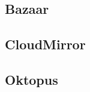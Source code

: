\subsection{Bazaar \texorpdfstring{\cite{bazaar}}{}}


\subsection{CloudMirror \texorpdfstring{\cite{cloudmirror}}{}}


\subsection{Oktopus \texorpdfstring{\cite{oktopus}}{}}
